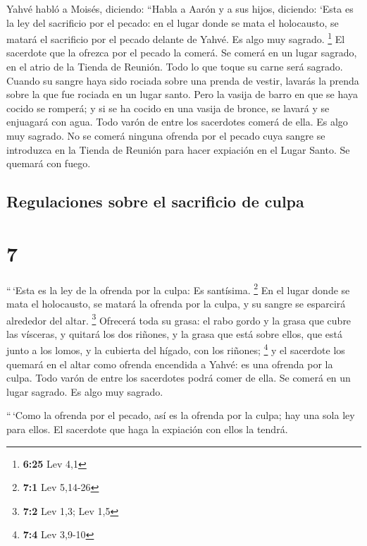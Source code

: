  Yahvé habló a Moisés, diciendo:  ``Habla
a Aarón y a sus hijos, diciendo: `Esta es la ley del sacrificio por el
pecado: en el lugar donde se mata el holocausto, se matará el sacrificio
por el pecado delante de Yahvé. Es algo muy sagrado. \footnote{\textbf{6:25}
  Lev 4,1}  El sacerdote que la ofrezca por el pecado la
comerá. Se comerá en un lugar sagrado, en el atrio de la Tienda de
Reunión.  Todo lo que toque su carne será sagrado. Cuando
su sangre haya sido rociada sobre una prenda de vestir, lavarás la
prenda sobre la que fue rociada en un lugar santo.  Pero
la vasija de barro en que se haya cocido se romperá; y si se ha cocido
en una vasija de bronce, se lavará y se enjuagará con agua.
 Todo varón de entre los sacerdotes comerá de ella. Es
algo muy sagrado.  No se comerá ninguna ofrenda por el
pecado cuya sangre se introduzca en la Tienda de Reunión para hacer
expiación en el Lugar Santo. Se quemará con fuego.

\hypertarget{regulaciones-sobre-el-sacrificio-de-culpa}{%
\subsection{Regulaciones sobre el sacrificio de
culpa}\label{regulaciones-sobre-el-sacrificio-de-culpa}}

\hypertarget{section-6}{%
\section{7}\label{section-6}}

 ``\,`Esta es la ley de la ofrenda por la culpa: Es
santísima. \footnote{\textbf{7:1} Lev 5,14-26}  En el
lugar donde se mata el holocausto, se matará la ofrenda por la culpa, y
su sangre se esparcirá alrededor del altar. \footnote{\textbf{7:2} Lev
  1,3; Lev 1,5}  Ofrecerá toda su grasa: el rabo gordo y
la grasa que cubre las vísceras,  y quitará los dos
riñones, y la grasa que está sobre ellos, que está junto a los lomos, y
la cubierta del hígado, con los riñones; \footnote{\textbf{7:4} Lev
  3,9-10}  y el sacerdote los quemará en el altar como
ofrenda encendida a Yahvé: es una ofrenda por la culpa. 
Todo varón de entre los sacerdotes podrá comer de ella. Se comerá en un
lugar sagrado. Es algo muy sagrado.

 ``\,`Como la ofrenda por el pecado, así es la ofrenda por
la culpa; hay una sola ley para ellos. El sacerdote que haga la
expiación con ellos la tendrá.

